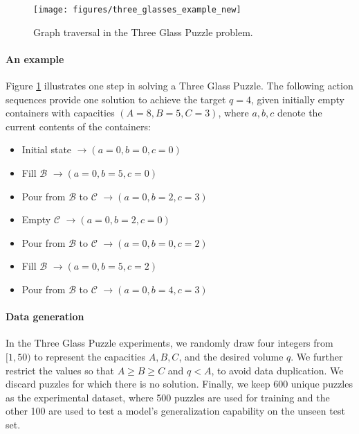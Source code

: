 \documentclass{article}
\begin{document}
	\begin{figure}[h!]
		\centering
		\texttt{[image: figures/three\_glasses\_example\_new]}
		\caption{Graph traversal in the Three Glass Puzzle problem.}
		\label{fig:reorder_a}
	\end{figure}

\paragraph{An example} Figure \ref{fig:reorder_a} illustrates one step in solving a Three Glass Puzzle. 
	The following action sequences provide one solution to achieve the target $q=4$, given initially empty containers with capacities  $(A=8, B=5, C=3)$, where $a, b, c$ denote the current contents of the containers:
	\begin{itemize}
		\item  {Initial state} $\rightarrow (a=0, b=0, c=0)$  
		\item  {Fill $\mathcal{B}$} $\rightarrow (a=0, b=5, c=0)$ 
		\item  {Pour from $\mathcal{B}$ to $\mathcal{C}$} $\rightarrow (a=0, b=2, c=3)$ 
		\item  {Empty $\mathcal{C}$} $\rightarrow (a=0, b=2, c=0)$ 
    	\item  {Pour from $\mathcal{B}$ to $\mathcal{C}$} $\rightarrow (a=0, b=0, c=2)$ 
		\item  {Fill $\mathcal{B}$} $\rightarrow (a=0, b=5, c=2)$ 
		\item  {Pour from $\mathcal{B}$ to $\mathcal{C}$} $\rightarrow (a=0, b=4, c=3)$
	\end{itemize}


\paragraph{Data generation} In the Three Glass Puzzle experiments, we randomly draw four integers from $[1, 50)$ to represent the capacities $A, B, C$, and the desired volume $q$. 
We further restrict the values so that $A \geq B \geq C$ and $q < A$, to avoid data duplication. We discard puzzles for which there is no solution. Finally, we keep 600 unique puzzles as the experimental dataset, where 500 puzzles are used for training and the other 100 are used to test a model's generalization capability on the unseen test set.
\end{document}
